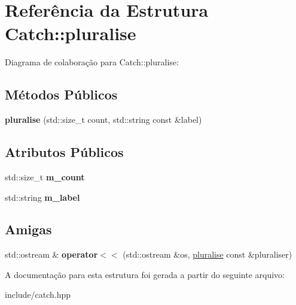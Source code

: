 \hypertarget{structCatch_1_1pluralise}{}\section{Referência da Estrutura Catch\+:\+:pluralise}
\label{structCatch_1_1pluralise}


Diagrama de colaboração para Catch\+:\+:pluralise\+:
\subsection*{Métodos Públicos}
\begin{DoxyCompactItemize}
\item 
{\bfseries pluralise} (std\+::size\+\_\+t count, std\+::string const \&label)\hypertarget{structCatch_1_1pluralise_a5c55e22de2416cfe416edf715c6b9234}{}\label{structCatch_1_1pluralise_a5c55e22de2416cfe416edf715c6b9234}

\end{DoxyCompactItemize}
\subsection*{Atributos Públicos}
\begin{DoxyCompactItemize}
\item 
std\+::size\+\_\+t {\bfseries m\+\_\+count}\hypertarget{structCatch_1_1pluralise_a4dce2fa13ec6f00fac09b2418265441e}{}\label{structCatch_1_1pluralise_a4dce2fa13ec6f00fac09b2418265441e}

\item 
std\+::string {\bfseries m\+\_\+label}\hypertarget{structCatch_1_1pluralise_a8849cbdd3f11ebe7747597c8644e8793}{}\label{structCatch_1_1pluralise_a8849cbdd3f11ebe7747597c8644e8793}

\end{DoxyCompactItemize}
\subsection*{Amigas}
\begin{DoxyCompactItemize}
\item 
std\+::ostream \& {\bfseries operator$<$$<$} (std\+::ostream \&os, \hyperlink{structCatch_1_1pluralise}{pluralise} const \&pluraliser)\hypertarget{structCatch_1_1pluralise_aa7dac6b165514c1f85e0695d678fdef5}{}\label{structCatch_1_1pluralise_aa7dac6b165514c1f85e0695d678fdef5}

\end{DoxyCompactItemize}


A documentação para esta estrutura foi gerada a partir do seguinte arquivo\+:\begin{DoxyCompactItemize}
\item 
include/catch.\+hpp\end{DoxyCompactItemize}
